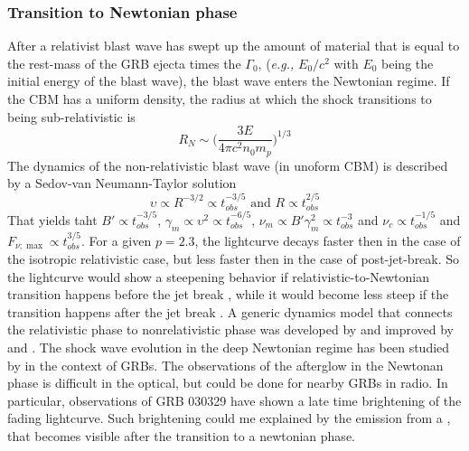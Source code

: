 
\subsubsection{Transition to Newtonian phase}

After a relativist blast wave has swept up the amount of material that is equal to the rest-mass of the GRB ejecta times the $\Gamma_0$, (\textit{e.g.,} $E_0/c^2$ with $E_0$ being the initial energy of the blast wave), the blast wave enters the Newtonian regime.
If the CBM has a uniform density, the radius at which the shock transitions to being sub-relativistic is 
\begin{equation}
R_N \sim \Bigg( \frac{3E}{4 \pi c^2 n_0 m_p} \Bigg)^{1/3}
\end{equation} 
The dynamics of the non-relativistic blast wave (in unoform CBM) is described by a Sedov-van Neumann-Taylor solution
\begin{equation}
\upsilon \propto R^{-3/2} \propto t^{-3/5}_{obs} \text{ and } R \propto t_{obs}^{2/5}
\end{equation}
That yields taht $B'\propto t_{obs}^{-3/5}$, $\gamma_m\propto\upsilon^2\propto t_{obs}^{-6/5}$, $\nu_m\propto B'\gamma_m^2\propto t_{obs}^{-3}$ and $\nu_c\propto t_{obs}^{-1/5}$ and $F_{\nu;\max}\propto t^{3/5}_{obs}$.
For a given $p=2.3$, the lightcurve decays faster then in the case of the isotropic relativistic case, but less faster then in the case of post-jet-break. 
So the lightcurve would show a steepening behavior if relativistic-to-Newtonian transition happens before
the jet break \cite{(Dai and Lu, 1999; Huang et al., 1999)}, while it would become less steep if the transition happens after the jet break \cite{(Livio and Waxman, 2000)}.
A generic dynamics model that connects the relativistic phase to nonrelativistic phase was developed by \cite{Huang et al. (1999)} and improved by \cite{Pe'er (2012)} and \cite{Nava et al. (2013)}. The shock wave evolution in the deep Newtonian regime has been studied by \cite{Huang and Cheng (2003)} in the context of GRBs.
The observations of the afterglow in the Newtonan phase is difficult in the optical, but could be done for nearby GRBs in radio. 
In particular, observations of GRB 030329 have shown a late time brightening of the fading lightcurve. Such brightening could me explained by the emission from a , that becomes visible after the transition to a newtonian phase. 
\cite{van der Horst et al., 2008; Zhang and MacFadyen, 2009}

